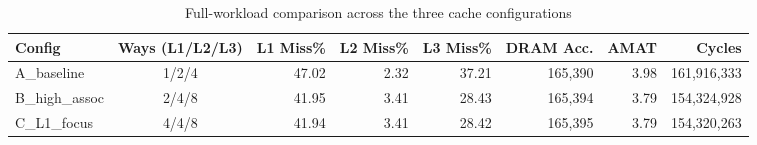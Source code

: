 \begin{table}[H]
\centering
\small
\begin{tabular}{lcrrrrrr}
\toprule
Config & Ways (L1/L2/L3) & L1 Miss\% & L2 Miss\% & L3 Miss\% & DRAM Acc. & AMAT & Cycles \\
\midrule
A\_baseline & 1/2/4 & 47.02 & 2.32 & 37.21 & 165,390 & 3.98 & 161,916,333 \\
B\_high\_assoc & 2/4/8 & 41.95 & 3.41 & 28.43 & 165,394 & 3.79 & 154,324,928 \\
C\_L1\_focus & 4/4/8 & 41.94 & 3.41 & 28.42 & 165,395 & 3.79 & 154,320,263 \\
\bottomrule
\end{tabular}
\caption{Full-workload comparison across the three cache configurations}
\label{tab:config-comparison}
\end{table}
